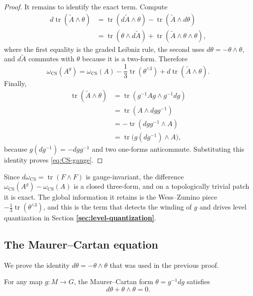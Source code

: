 \documentclass[11pt]{article}
\newcommand{\tr}{\operatorname{tr}}
\newcommand{\CS}{\operatorname{CS}}
\theoremstyle{definition}
\numberwithin{theorem}{section}
\numberwithin{equation}{section}
\begin{document}
\begin{proof}
\medskip

\noindent It remains to identify the exact term. Compute
\begin{align*}
d\tr(\tilde A\wedge\theta)
&= \tr(d\tilde A\wedge\theta) - \tr(\tilde A\wedge d\theta) \\
&= \tr(\theta\wedge d\tilde A) + \tr(\tilde A\wedge\theta\wedge\theta),
\end{align*}
where the first equality is the graded Leibniz rule, the second uses $d\theta=-\theta\wedge\theta$, and $d\tilde A$ commutes with $\theta$ because it is a two-form. Therefore
\begin{equation*}
\omega_{\CS}(A^g)
= \omega_{\CS}(A)
 - \frac{1}{3}\tr(\theta^{\wedge 3})
 + d\tr(\tilde A\wedge\theta).
\end{equation*}
Finally,
\begin{align*}
\tr(\tilde A\wedge\theta)
&= \tr(g^{-1}Ag\wedge g^{-1}dg) \\
&= \tr(A\wedge dgg^{-1}) \\
&= -\tr(dgg^{-1}\wedge A) \\
&= \tr\bigl(g(dg^{-1})\wedge A\bigr),
\end{align*}
because $g(dg^{-1})=-dgg^{-1}$ and two one-forms anticommute. Substituting this identity proves \eqref{eq:CS-gauge}.
\end{proof}

\begin{remark}
Since $d\omega_{\CS} = \tr(F\wedge F)$ is gauge-invariant, the difference $\omega_{\CS}(A^g) - \omega_{\CS}(A)$ is a closed three-form, and on a topologically trivial patch it is exact. The global information it retains is the Wess--Zumino piece $-\tfrac{1}{3}\tr(\theta^{\wedge 3})$, and this is the term that detects the winding of $g$ and drives level quantization in Section \textbf{\ref{sec:level-quantization}}.
\end{remark}

\subsection{The Maurer--Cartan equation}

We prove the identity $d\theta = -\theta\wedge\theta$ that was used in the previous proof.

\begin{lemma}\label{lem:MC}
For any map $g:M\to G$, the Maurer--Cartan form $\theta = g^{-1}dg$ satisfies
\begin{equation}\label{eq:MC}
d\theta + \theta\wedge\theta = 0.
\end{equation}
\end{lemma}
\end{document}
